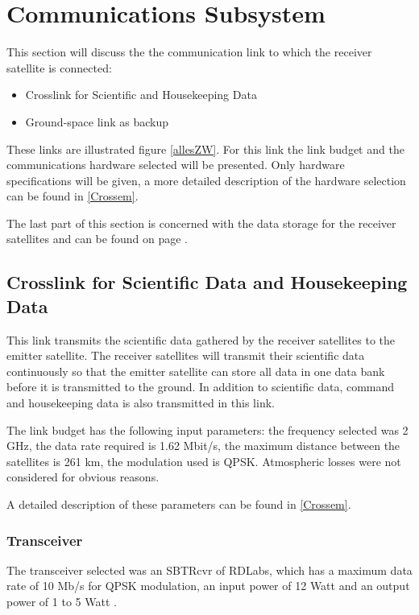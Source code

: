 \section{Communications Subsystem}
\label{sec:comm_receiver}
This section will discuss the  the communication link to which the receiver satellite is connected:
\begin{itemize}
\item Crosslink for Scientific and Housekeeping Data
\item Ground-space link as backup
\end{itemize}

These links are illustrated figure \ref{allesZW}.
For this link the link budget and the communications hardware selected will be presented. Only hardware specifications will be given, a more detailed description of the hardware selection can be found in \ref{Crossem}.

The last part of this section is concerned with the data storage for the receiver satellites and can be found on page \pageref{DSReceiver}.

\subsection{Crosslink for Scientific Data and Housekeeping Data}
This link transmits the scientific data gathered by the receiver satellites to the emitter satellite. The receiver satellites will transmit their scientific data continuously so that the emitter satellite can store all data in one data bank before it is transmitted to the ground. In addition to scientific data, command and housekeeping data is also transmitted in this link.

The link budget has the following input parameters: the frequency selected was 2 GHz, the data rate required is 1.62 Mbit/s, the maximum distance between the satellites is 261 km, the modulation used is QPSK. Atmospheric losses were not considered for obvious reasons.

A detailed description of these parameters can be found in \ref{Crossem}.

\subsubsection{Transceiver}
The transceiver selected was an SBTRcvr of RDLabs, which has a maximum data rate of 10 Mb/s for QPSK modulation, an input power of 12 Watt and an output power of 1 to 5 Watt \cite{RDLabs}.

